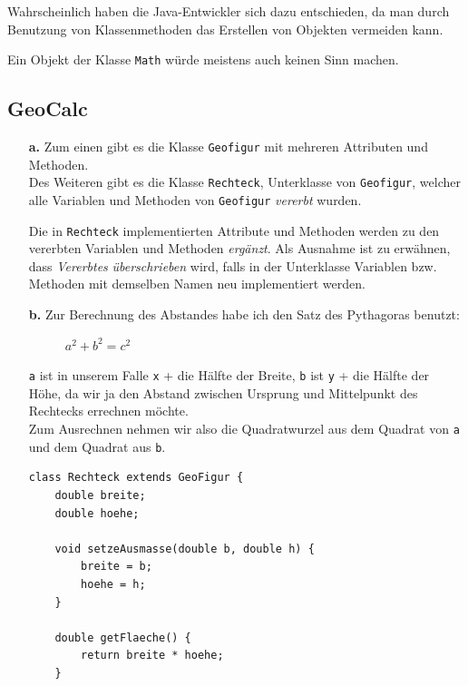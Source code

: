 \documentclass{scrartcl}   %
\begin{document}
Wahrscheinlich haben die Java-Entwickler sich dazu entschieden, da man durch Benutzung von Klassenmethoden das Erstellen von Objekten vermeiden kann.

Ein Objekt der Klasse \texttt{Math} würde meistens auch keinen Sinn machen.

\newpage

\subsection{GeoCalc}

\begin{itemize}
    \item[\textbf{a.}] Zum einen gibt es die Klasse \texttt{Geofigur} mit mehreren Attributen und Methoden.\\
    Des Weiteren gibt es die Klasse \texttt{Rechteck}, Unterklasse von \texttt{Geofigur}, welcher alle Variablen und Methoden von \texttt{Geofigur} \textit{vererbt} wurden.
    
    Die in \texttt{Rechteck} implementierten Attribute und Methoden werden zu den vererbten Variablen und Methoden \textit{ergänzt}. Als Ausnahme ist zu erwähnen, dass \textit{Vererbtes} \textit{überschrieben} wird, falls in der Unterklasse Variablen bzw. Methoden mit demselben Namen neu implementiert werden.
    
    \item[\textbf{b.}] Zur Berechnung des Abstandes habe ich den Satz des Pythagoras benutzt:
    \begin{figure}[ht]
    	\centering
    	$a^2 + b^2 = c^2$
    \end{figure}
    
    \texttt{a} ist in unserem Falle \texttt{x} + die Hälfte der Breite, \texttt{b} ist \texttt{y} + die Hälfte der Höhe, da wir ja den Abstand zwischen Ursprung und Mittelpunkt des Rechtecks errechnen möchte.\\
    Zum Ausrechnen nehmen wir also die Quadratwurzel aus dem Quadrat von \texttt{a} und dem Quadrat aus \texttt{b}.\\
    \begin{lstlisting}
class Rechteck extends GeoFigur {
    double breite;
    double hoehe;
    
    void setzeAusmasse(double b, double h) {
        breite = b;
        hoehe = h;
    }
    
    double getFlaeche() {
        return breite * hoehe;
    }
    
    
    

\end{lstlisting}
\end{itemize}
\end{document}
